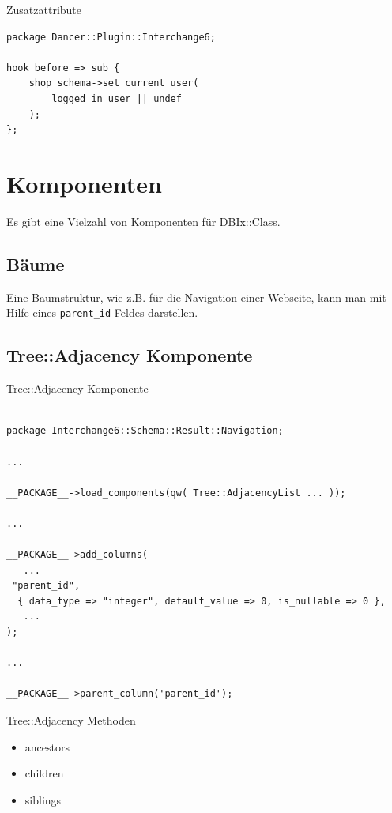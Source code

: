 \begin{frame}[fragile]{Zusatzattribute}
\begin{lstlisting}
package Dancer::Plugin::Interchange6;

hook before => sub {
    shop_schema->set_current_user(
        logged_in_user || undef
    );
};

\end{lstlisting}
\end{frame}

\section{Komponenten}

Es gibt eine Vielzahl von Komponenten für DBIx::Class.

\subsection{Bäume}

Eine Baumstruktur, wie z.B. für die Navigation einer
Webseite, kann man mit Hilfe eines \verb|parent_id|-Feldes
darstellen.

\subsection{Tree::Adjacency Komponente}

\begin{frame}[fragile]{Tree::Adjacency Komponente}
\begin{lstlisting}

package Interchange6::Schema::Result::Navigation;

...

__PACKAGE__->load_components(qw( Tree::AdjacencyList ... ));

...

__PACKAGE__->add_columns(
   ...
 "parent_id",
  { data_type => "integer", default_value => 0, is_nullable => 0 },
   ...
);

...

__PACKAGE__->parent_column('parent_id');

\end{lstlisting}
\end{frame}

\begin{frame}{Tree::Adjacency Methoden}
\begin{itemize}
\item ancestors
\item children
\item siblings
\end{itemize}
\end{frame}

